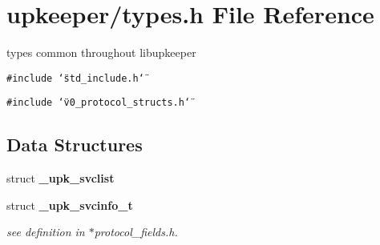 \section{upkeeper/types.h File Reference}
\label{types_8h}
types common throughout libupkeeper 

{\tt \#include \char`\"{}std\_\-include.h\char`\"{}}\par
{\tt \#include \char`\"{}v0\_\-protocol\_\-structs.h\char`\"{}}\par
\subsection*{Data Structures}
\begin{CompactItemize}
\item 
struct \bf{\_\-upk\_\-svclist}
\item 
struct \bf{\_\-upk\_\-svcinfo\_\-t}
\begin{CompactList}\small\item\em see definition in $\ast$protocol\_\-fields.h. \item\end{CompactList}\end{CompactItemize}
